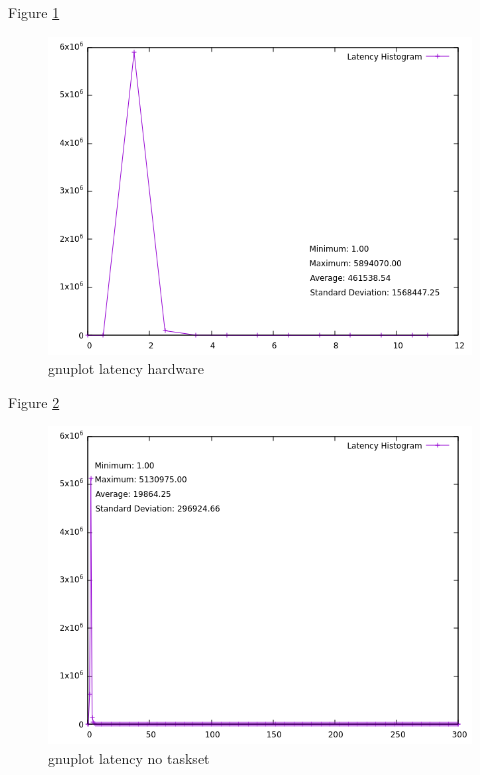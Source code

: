 \documentclass[MMR,Master,english]{twbook}
\begin{document}
   Figure \ref{fig:gnuplot_max_latency_hardware}
   \begin{figure}[H]
       \centering
       \includegraphics[width=0.8\columnwidth]{masterthesis-documentation/docs/sigmatek/xenomai/hardware/gnuplot_max_latency_hardware.png}
       \caption[gnuplot latency hardware]{gnuplot latency hardware}
       \label{fig:gnuplot_max_latency_hardware}
     \end{figure}

     Figure \ref{fig:gnuplot_max_latency_no_taskset}
     \begin{figure}[H]
         \centering
         \includegraphics[width=0.8\columnwidth]{masterthesis-documentation/docs/sigmatek/xenomai/default/gnuplot_max_latency_default.png}
         \caption[gnuplot latency no taskset]{gnuplot latency no taskset}
         \label{fig:gnuplot_max_latency_no_taskset}
       \end{figure}
\end{document}
